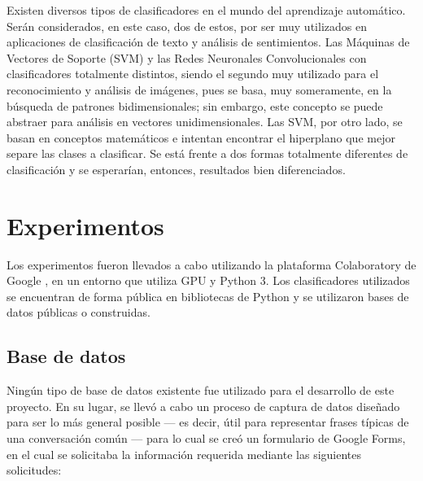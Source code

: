 \documentclass[conference]{IEEEtran}
\begin{document}
        Existen diversos tipos de clasificadores en el mundo del aprendizaje automático. Serán considerados, en este caso, dos de estos, por ser muy utilizados en aplicaciones de clasificación de texto y análisis de sentimientos. Las Máquinas de Vectores de Soporte (SVM) y las Redes Neuronales Convolucionales con clasificadores totalmente distintos, siendo el segundo muy utilizado para el reconocimiento y análisis de imágenes, pues se basa, muy someramente, en la búsqueda de patrones bidimensionales; sin embargo, este concepto se puede abstraer para análisis en vectores unidimensionales. Las SVM, por otro lado, se basan en conceptos matemáticos e intentan encontrar el hiperplano que mejor separe las clases a clasificar. Se está frente a dos formas totalmente diferentes de clasificación y se esperarían, entonces, resultados bien diferenciados.
    
    



\section{Experimentos} \label{sec:experimentos}

    Los experimentos fueron llevados a cabo utilizando la plataforma Colaboratory de Google \cite{colaboratory}, en un entorno que utiliza GPU y Python 3. Los clasificadores utilizados se encuentran de forma pública en bibliotecas de Python y se utilizaron bases de datos públicas o construidas.
    
    
    \subsection{Base de datos}
    
        Ningún tipo de base de datos existente fue utilizado para el desarrollo de este proyecto. En su lugar, se llevó a cabo un proceso de captura de datos diseñado para ser lo más general posible --- es decir, útil para representar frases típicas de una conversación común --- para lo cual se creó un formulario de Google Forms, en el cual se solicitaba la información requerida mediante las siguientes solicitudes:
        
\end{document}
